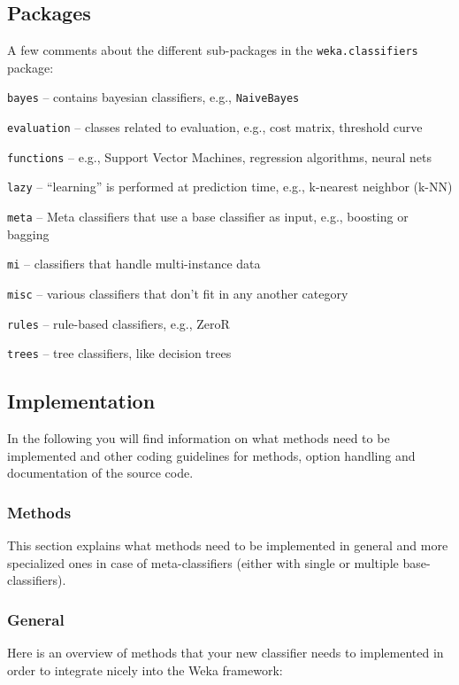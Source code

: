 \subsection{Packages}
A few comments about the different sub-packages in the \texttt{weka.classifiers}
package:
\begin{tight_itemize}
  \item \texttt{bayes} -- contains bayesian classifiers, e.g.,
\texttt{NaiveBayes}
  \item \texttt{evaluation} -- classes related to evaluation, e.g., cost
matrix, threshold curve
  \item \texttt{functions} -- e.g., Support Vector Machines, regression
algorithms, neural nets
  \item \texttt{lazy} -- ``learning'' is performed at prediction time, e.g.,
k-nearest neighbor (k-NN)
  \item \texttt{meta} -- Meta classifiers that use a base classifier as input,
e.g., boosting or bagging
  \item \texttt{mi} -- classifiers that handle multi-instance data
  \item \texttt{misc} -- various classifiers that don't fit in any another
category
  \item \texttt{rules} -- rule-based classifiers, e.g., ZeroR
  \item \texttt{trees} -- tree classifiers, like decision trees
\end{tight_itemize}

\subsection{Implementation}
In the following you will find information on what methods need to be
implemented and other coding guidelines for methods, option handling and
documentation of the source code.

\subsubsection{Methods}
This section explains what methods need to be implemented in general and more
specialized ones in case of meta-classifiers (either with single or multiple
base-classifiers).

\subsubsection*{General}
Here is an overview of methods that your new classifier needs to implemented in
order to integrate nicely into the Weka framework:


